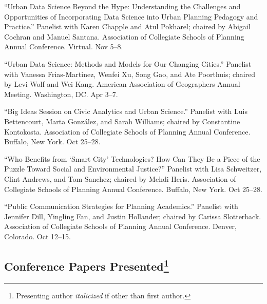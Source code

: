 \documentclass[11pt,a4paper]{report} %
\begin{document}
\begin{tablist}
\item[2020] \tab{}\enquote{Urban Data Science Beyond the Hype: Understanding the Challenges and Opportunities of Incorporating Data Science into Urban Planning Pedagogy and Practice.} Panelist with Karen Chapple and Atul Pokharel; chaired by Abigail Cochran and Manuel Santana. Association of Collegiate Schools of Planning Annual Conference. Virtual. Nov 5--8.

\item[2019] \tab{}\enquote{Urban Data Science: Methods and Models for Our Changing Cities.} Panelist with Vanessa Frias-Martinez, Wenfei Xu, Song Gao, and Ate Poorthuis; chaired by Levi Wolf and Wei Kang. American Association of Geographers Annual Meeting. Washington, DC\@. Apr 3--7.

\item[2018] \tab{}\enquote{Big Ideas Session on Civic Analytics and Urban Science.} Panelist with Luis Bettencourt, Marta Gonz{\'a}lez, and Sarah Williams; chaired by Constantine Kontokosta. Association of Collegiate Schools of Planning Annual Conference. Buffalo, New York. Oct 25--28.

\item[2018] \tab{}\enquote{Who Benefits from \enquote{Smart City} Technologies? How Can They Be a Piece of the Puzzle Toward Social and Environmental Justice?} Panelist with Lisa Schweitzer, Clint Andrews, and Tom Sanchez; chaired by Mehdi Heris. Association of Collegiate Schools of Planning Annual Conference. Buffalo, New York. Oct 25--28.

\item[2017] \tab{}\enquote{Public Communication Strategies for Planning Academics.} Panelist with Jennifer Dill, Yingling Fan, and Justin Hollander; chaired by Carissa Slotterback. Association of Collegiate Schools of Planning Annual Conference. Denver, Colorado. Oct 12--15.

\end{tablist}

\subsection*{Conference Papers Presented\footnote{Presenting author \textit{italicized} if other than first author.}}
\end{document}

